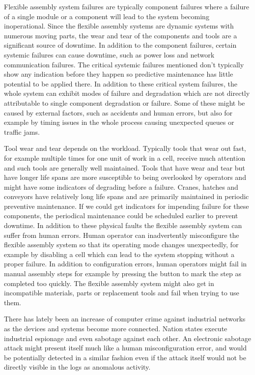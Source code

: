 \documentclass[journal]{IEEEtran}
\begin{document}
Flexible assembly system failures are typically component failures where a failure of a single module or a component will lead to the system becoming inoperational.
Since the flexible assembly systems are dynamic systems with numerous moving parts, the wear and tear of the components and tools are a significant source of downtime.
In addition to the component failures, certain systemic failures can cause downtime, such as power loss and network communication failures.
The critical systemic failures mentioned don't typically show any indication before they happen so predictive maintenance has little potential to be applied there.
In addition to these critical system failures,
the whole system can exhibit modes of failure and degradation which are not directly attributable to single component degradation or failure. Some of these might be caused by
external factors, such as accidents and human errors, but also for example by timing issues in the whole process causing unexpected queues or traffic jams.

Tool wear and tear depends on the workload. Typically tools that wear out fast, for example multiple times for one unit of work in a cell, receive much attention and such tools are generally
well maintained. Tools that have wear and tear but have longer life spans are more susceptible to being overlooked by operators and might have some indicators of degrading
before a failure. Cranes, hatches and conveyors have relatively long life spans and are primarily maintained in periodic preventive maintenance. If we could get indicators
for impending failure for these components, the periodical maintenance could be scheduled earlier to prevent downtime. In addition to these physical faults the flexible
assembly system can suffer from human errors. Human operator can inadvertently misconfigure the flexible assembly system so that its operating mode changes unexpectedly,
for example by disabling a cell which can lead to the system stopping without a proper failure. In addition to configuration
errors, human operators might fail in manual assembly steps for example by pressing the button to mark the step
as completed too quickly.
The flexible assembly system might also get in incompatible materials, parts or replacement tools and fail when trying to use them.

There has lately been an increase of computer crime against industrial networks as the devices and systems become more connected.
Nation states execute industrial espionage and even sabotage against each other\cite{stuxnet}. An electronic sabotage attack might present itself
much like a human misconfiguration error, and would be potentially detected in a similar fashion even if the attack itself would not be
directly visible in the logs as anomalous activity.
\end{document}
